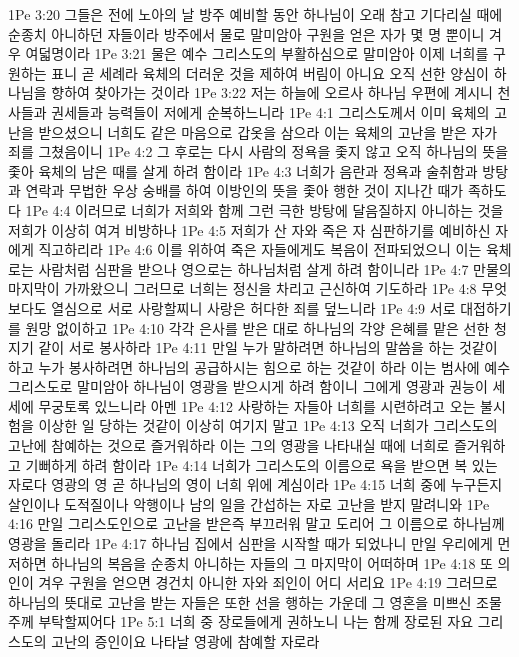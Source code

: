 1Pe 3:20  그들은 전에 노아의 날 방주 예비할 동안 하나님이 오래 참고 기다리실 때에 순종치 아니하던 자들이라 방주에서 물로 말미암아 구원을 얻은 자가 몇 명 뿐이니 겨우 여덟명이라
1Pe 3:21  물은 예수 그리스도의 부활하심으로 말미암아 이제 너희를 구원하는 표니 곧 세례라 육체의 더러운 것을 제하여 버림이 아니요 오직 선한 양심이 하나님을 향하여 찾아가는 것이라
1Pe 3:22  저는 하늘에 오르사 하나님 우편에 계시니 천사들과 권세들과 능력들이 저에게 순복하느니라
1Pe 4:1  그리스도께서 이미 육체의 고난을 받으셨으니 너희도 같은 마음으로 갑옷을 삼으라 이는 육체의 고난을 받은 자가 죄를 그쳤음이니
1Pe 4:2  그 후로는 다시 사람의 정욕을 좇지 않고 오직 하나님의 뜻을 좇아 육체의 남은 때를 살게 하려 함이라
1Pe 4:3  너희가 음란과 정욕과 술취함과 방탕과 연락과 무법한 우상 숭배를 하여 이방인의 뜻을 좇아 행한 것이 지나간 때가 족하도다
1Pe 4:4  이러므로 너희가 저희와 함께 그런 극한 방탕에 달음질하지 아니하는 것을 저희가 이상히 여겨 비방하나
1Pe 4:5  저희가 산 자와 죽은 자 심판하기를 예비하신 자에게 직고하리라
1Pe 4:6  이를 위하여 죽은 자들에게도 복음이 전파되었으니 이는 육체로는 사람처럼 심판을 받으나 영으로는 하나님처럼 살게 하려 함이니라
1Pe 4:7  만물의 마지막이 가까왔으니 그러므로 너희는 정신을 차리고 근신하여 기도하라
1Pe 4:8  무엇보다도 열심으로 서로 사랑할찌니 사랑은 허다한 죄를 덮느니라
1Pe 4:9  서로 대접하기를 원망 없이하고
1Pe 4:10  각각 은사를 받은 대로 하나님의 각양 은혜를 맡은 선한 청지기 같이 서로 봉사하라
1Pe 4:11  만일 누가 말하려면 하나님의 말씀을 하는 것같이 하고 누가 봉사하려면 하나님의 공급하시는 힘으로 하는 것같이 하라 이는 범사에 예수 그리스도로 말미암아 하나님이 영광을 받으시게 하려 함이니 그에게 영광과 권능이 세세에 무궁토록 있느니라 아멘
1Pe 4:12  사랑하는 자들아 너희를 시련하려고 오는 불시험을 이상한 일 당하는 것같이 이상히 여기지 말고
1Pe 4:13  오직 너희가 그리스도의 고난에 참예하는 것으로 즐거워하라 이는 그의 영광을 나타내실 때에 너희로 즐거워하고 기뻐하게 하려 함이라
1Pe 4:14  너희가 그리스도의 이름으로 욕을 받으면 복 있는 자로다 영광의 영 곧 하나님의 영이 너희 위에 계심이라
1Pe 4:15  너희 중에 누구든지 살인이나 도적질이나 악행이나 남의 일을 간섭하는 자로 고난을 받지 말려니와
1Pe 4:16  만일 그리스도인으로 고난을 받은즉 부끄러워 말고 도리어 그 이름으로 하나님께 영광을 돌리라
1Pe 4:17  하나님 집에서 심판을 시작할 때가 되었나니 만일 우리에게 먼저하면 하나님의 복음을 순종치 아니하는 자들의 그 마지막이 어떠하며
1Pe 4:18  또 의인이 겨우 구원을 얻으면 경건치 아니한 자와 죄인이 어디 서리요
1Pe 4:19  그러므로 하나님의 뜻대로 고난을 받는 자들은 또한 선을 행하는 가운데 그 영혼을 미쁘신 조물주께 부탁할찌어다
1Pe 5:1  너희 중 장로들에게 권하노니 나는 함께 장로된 자요 그리스도의 고난의 증인이요 나타날 영광에 참예할 자로라
